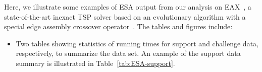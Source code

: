 \documentclass[aic]{iosart2x}
\begin{document}
\label{sec:ESA-Output}

 Here, we illustrate some examples of ESA output from our analysis on EAX~\cite{NagKob13}, a state-of-the-art inexact TSP solver based on an evolutionary algorithm with a special edge assembly crossover operator~\cite{Nag97}. The tables and figures include:
\begin{itemize}
\item Two tables showing statistics of running times for support and challenge data, respectively, to summarize the data set. An example of the support data summary is illustrated in Table~\ref{tab:ESA-support}.
\begin{table}[t]
\caption{Support data summary for EAX on RUE instances \label{tab:ESA-support}}
\begin{centering}
\medskip{}
\par
\end{centering}
\end{table}


\end{itemize}
\end{document}

